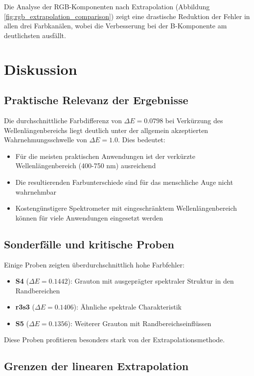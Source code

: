 Die Analyse der RGB-Komponenten nach Extrapolation (Abbildung \ref{fig:rgb_extrapolation_comparison}) zeigt eine drastische Reduktion der Fehler in allen drei Farbkanälen, wobei die Verbesserung bei der B-Komponente am deutlichsten ausfällt.

\section{Diskussion}

\subsection{Praktische Relevanz der Ergebnisse}

Die durchschnittliche Farbdifferenz von $\Delta E = 0.0798$ bei Verkürzung des Wellenlängenbereichs liegt deutlich unter der allgemein akzeptierten Wahrnehmungsschwelle von $\Delta E = 1.0$. Dies bedeutet:

\begin{itemize}
    \item Für die meisten praktischen Anwendungen ist der verkürzte Wellenlängenbereich (400-750 nm) ausreichend
    \item Die resultierenden Farbunterschiede sind für das menschliche Auge nicht wahrnehmbar
    \item Kostengünstigere Spektrometer mit eingeschränktem Wellenlängenbereich können für viele Anwendungen eingesetzt werden
\end{itemize}

\subsection{Sonderfälle und kritische Proben}

Einige Proben zeigten überdurchschnittlich hohe Farbfehler:
\begin{itemize}
    \item \textbf{S4} ($\Delta E = 0.1442$): Grauton mit ausgeprägter spektraler Struktur in den Randbereichen
    \item \textbf{r3s3} ($\Delta E = 0.1406$): Ähnliche spektrale Charakteristik
    \item \textbf{S5} ($\Delta E = 0.1356$): Weiterer Grauton mit Randbereichseinflüssen
\end{itemize}

Diese Proben profitieren besonders stark von der Extrapolationsmethode.

\subsection{Grenzen der linearen Extrapolation}

